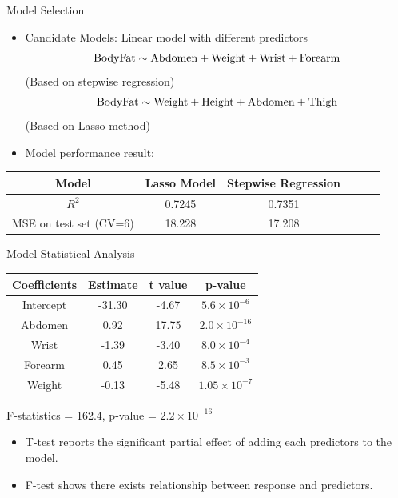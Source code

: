 \documentclass{beamer}
\begin{document}
\begin{frame}{Model Selection}
\begin{itemize}
\item Candidate Models: Linear model with different predictors
\begin{align*}
\rm
Body Fat \sim Abdomen + Weight + Wrist + Forearm
\end{align*}
\centering
(Based on stepwise regression)
\begin{align*}
\rm
Body Fat \sim Weight + Height + Abdomen + Thigh
\end{align*}
\centering
(Based on Lasso method)
\end{itemize}

\begin{itemize}
\item Model performance result:
\end{itemize}

\centering
\begin{tabular}{cccccc}
   \toprule
   Model & Lasso Model & Stepwise Regression \\
   \midrule
   $R^2$ & 0.7245 & 0.7351 \\   
   MSE on test set (CV=6) & 18.228  & 17.208 \\
   \bottomrule
\end{tabular}
\end{frame}

\begin{frame}{Model Statistical Analysis}

\begin{center}
\begin{tabular}{cccc}
   \toprule
   Coefficients & Estimate & t value & p-value \\
   \midrule
   Intercept & -31.30 & -4.67 & $5.6\times 10^{-6}$ \\   
   Abdomen & 0.92  & 17.75 & $2.0\times 10^{-16}$\\
   Wrist & -1.39 & -3.40 & $8.0\times 10^{-4}$\\   
   Forearm & 0.45  & 2.65 & $8.5\times 10^{-3}$\\
   Weight & -0.13  & -5.48 & $1.05\times 10^{-7}$\\
   \bottomrule
\end{tabular}
\end{center}

\begin{center}
F-statistics = 162.4, p-value = $2.2\times 10^{-16}$
\end{center}

\begin{itemize}
\item T-test reports the significant partial effect of adding each predictors to the model.
\item F-test shows there exists relationship between response and predictors.
\end{itemize}
\end{frame}
\end{document}
